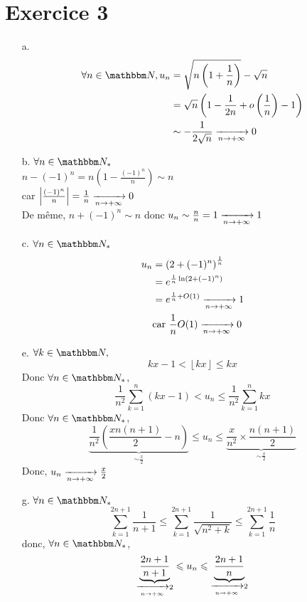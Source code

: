 \part{Exercice 3}

\begin{enumerate}
	\item[a.]
		\begin{align*}
			\forall  n \in \N, u_n &= \sqrt{n\left( 1+\frac{1}{n} \right)} - \sqrt{n}\\
										&= \sqrt{n}\left(1- \frac{1}{2n} + o\left( \frac{1}{n} \right) -1  \right) \\
										&\sim -\frac{1}{2\sqrt{n}} \tendsto{n \to +\infty} 0\\
		\end{align*}
	\item[b.] $\forall n \in \N_*$ \\
		$n - (-1)^n = n\left(1 - \frac{(-1)^n}{n}\right) \sim n$ \\
		car $\left| \frac{(-1)^n}{n} \right| = \frac{1}{n} \xrightarrow[n \to +\infty]{} 0$ \\
		De même, $n + (-1)^n \sim n$ donc $u_n \sim \frac{n}{n} = 1 \xrightarrow[n \to +\infty]{} 1$ 
	\item[c.] $\forall n \in \N_*$
		\begin{align*}
			u_n &= \left( 2 + (-1)^n \right) ^{\frac{1}{n}} \\
			&= e^{\frac{1}{n}\ln\left( 2 + (-1)^n \right) } \\
			&= e^{\frac{1}{n} + O(1)} \xrightarrow[n \to +\infty]{} 1 \\
			&\text{car } \frac{1}{n}O(1) \xrightarrow[n \to +\infty]{} 0
		\end{align*}
	\item[e.] $\forall k \in \N,$
		\[
			kx - 1 < \left\lfloor kx \right\rfloor \le kx
		\] Donc $\forall n \in \N_*$,\[
			\frac{1}{n^2} \sum_{k=1}^n(kx -1) < u_n \le \frac{1}{n^2}\sum_{k=1}^n kx
		\] Donc $\forall n \in \N_*$, \[
			\underbrace{\frac{1}{n^2}\left( \frac{xn(n+1)}{2} - n \right)}_{\sim \frac{x}{2}} \le u_n \le \underbrace{\frac{x}{n^2} \times \frac{n(n+1)}{2}}_{\sim \frac{x}{2}}	
		\]
		Donc, $u_n \xrightarrow[n \to +\infty]{} \frac{x}{2}$ 
	\item[g.]
		$\forall n \in \N_*$ \\
		\[
			\sum_{k=1}^{2n+1} \frac{1}{n+1} \le \sum_{k=1}^{2n+1} \frac{1}{\sqrt{n^2+k}} \le \sum_{k=1}^{2n+1}\frac{1}{n}
		\] donc, $\forall n \in \N_*$, \[
			\underbrace{\frac{2n+1}{n+1}}_{\xrightarrow[n\to +\infty]{}2} \leqslant u_n \leqslant \underbrace{\frac{2n+1}{n}}_{\xrightarrow[n\to +\infty]{}2}
\]
\end{enumerate}
